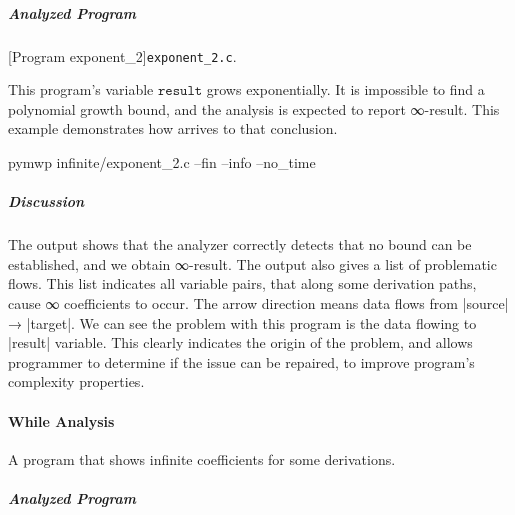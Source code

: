 \subparagraph*{Analyzed Program}

\begin{center}
\begin{minipage}{\textwidth}
\captionsetup{type=lstlisting}
[Program exponent\_2]{\texttt{exponent\_2.c}.}
\label{lst:exponent2}
\end{minipage}
\end{center}

This program's variable \(\texttt{result}\) grows exponentially. It is
impossible to find a polynomial growth bound, and the analysis is expected to
report ∞-result. This example demonstrates how  arrives
to that conclusion.

\begin{center}
\begin{minipage}{\textwidth}
\begin{cmdlisting}[label={lst:ex2-run-cmd}]
pymwp infinite/exponent_2.c --fin --info --no_time
\end{cmdlisting}
\end{minipage}
\end{center}

\begin{center}
\begin{minipage}{\textwidth}
\end{minipage}
\label{lst:ex2-output}
\end{center}

\subparagraph*{Discussion}
The output shows that the analyzer correctly detects that no bound can be
established, and we obtain ∞-result. The output also gives a list
of problematic flows. This list indicates all variable pairs, that along some
derivation paths, cause ∞ coefficients to occur. The arrow
direction means data flows from \pr|source| → \pr|target|. We can see the
problem with this program is the data flowing to \pr|result| variable. This
clearly indicates the origin of the problem, and allows programmer to determine
if the issue can be repaired, to improve program's complexity properties.

\paragraph{While Analysis}\label{while-analysis}
A program that shows infinite coefficients for some derivations.

\subparagraph*{Analyzed Program}

